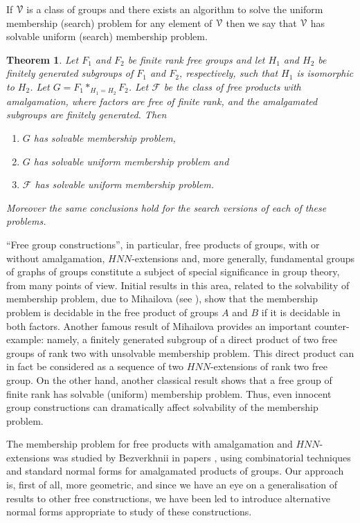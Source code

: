 \documentclass[a4paper,12pt]{article}
\newcommand{\cF}{{\cal{F}}}
\newcommand{\cV}{{\cal{V}}}
\newtheorem{theorem}{Theorem}[section]
\numberwithin{equation}{section}
\numberwithin{figure}{section}
\renewcommand{\cF}{\mathcal{F}}
\newcommand{\be}{\begin{enumerate}}
\newcommand{\ee}{\end{enumerate}}
\begin{document}
If $\cV$ is a class of groups and there exists an algorithm to
solve the uniform membership (search) problem for any element of $\cV$ then
we say that $\cV$ has solvable uniform  (search) membership problem. 



\begin{theorem}\label{thm:membership}
Let $F_1$ and $F_2$ be finite rank free groups and let $H_1$ and $H_2$
be finitely generated subgroups of $F_1$ and $F_2$, respectively, such
that $H_1$ is isomorphic to $H_2$. Let $G=F_1 \ast_{H_1=H_2} F_2$. 
Let $\cF$ be the class of free products with amalgamation, where
factors are free of finite rank, and the amalgamated subgroups are
finitely generated. 
Then
\be
\item\label{it:membership}
$G$ has solvable membership problem, 
\item \label{it:uni-membership}
$G$ has solvable uniform  membership problem and 
\item\label{it:class-uni-membership}
$\cF$ has solvable uniform  membership problem.
\ee
Moreover the same conclusions hold for the search versions of each of these
problems. 
\end{theorem}


``Free group constructions'', in particular, free products of groups,
with or without amalgamation, $HNN$-extensions
 and, more generally, fundamental groups
of graphs of groups constitute a subject of special significance in
group theory, from many points of view. Initial results in this area,
related to the solvability of membership problem,  due to Mihailova (see
\cite{mi59,mi68}), show that the membership problem is
decidable in the free product of groups $A$ and $B$ if it is decidable
in both factors. Another famous result of
Mihailova \cite{mi58}  provides an important counter-example:
 namely,  a finitely generated
subgroup of a direct product of two free groups of rank two with
unsolvable membership problem.  This direct
product can in fact be considered as a sequence of two $HNN$-extensions
of rank two free group. On the other hand, another classical
result \cite[Proposition 2.21]{LS} shows that a free group of finite rank has 
solvable (uniform)
membership problem. Thus,  even innocent group
constructions can dramatically affect solvability of the membership problem.

The membership problem for free products with amalgamation and
$HNN$-extensions was studied by Bezverkhnii in papers
\cite{bez81,bez86,bez90,bez91}, using  combinatorial
techniques and standard normal forms for  amalgamated products of
groups. Our approach is, first of all, more geometric, and since
we have an eye on a generalisation of results to other free
constructions, we have been led to introduce alternative normal forms
 appropriate to
study of these constructions.
\end{document}
